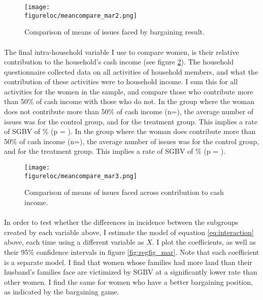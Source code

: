 \documentclass[10pt,a4paper]{scrartcl} %
\newcommand{\figureloc}{C:/Users/Koen/Dropbox/PhD/Papers/CongoGBV/Figures}
\begin{document}
\begin{figure}[H]
  \texttt{[image: \\figureloc/meancompare\_mar2.png]}
  \caption{Comparison of means of issues faced by bargaining result.}
  \label{fig:meancompare_mar2}
\end{figure}

\paragraph{}
The final intra-household variable I use to compare women, is their relative contribution to the household's cash income (see figure \ref{fig:meancompare_mar3}). The household questionnaire collected data on all activities of household members, and what the contribution of these activities were to household income. I sum this for all activities for the women in the sample, and compare those who contribute more than 50\% of cash income with those who do not. In the group where the woman does not contribute more than 50\% of cash income (n=), the average number of issues was  for the control group, and  for the treatment group. This implies a rate of SGBV of \% (p = ). In the group where the woman does contribute more than 50\% of cash income (n=), the average number of issues was  for the control group, and  for the treatment group. This implies a rate of SGBV of \% (p = ). 

\begin{figure}[H]
  \texttt{[image: \\figureloc/meancompare\_mar3.png]}
  \caption{Comparison of means of issues faced across contribution to cash income.}
  \label{fig:meancompare_mar3}
\end{figure}


\paragraph{}
In order to test whether the differences in incidence between the subgroups created by each variable above, I estimate the model of equation \ref{eq:interaction} above, each time using a different variable as $X$. I plot the coefficients, as well as their 95\% confidence intervals in figure \ref{fig:regfig_mar}. Note that each coefficient is a separate model. I find that women whose families had more land than their husband's families face are victimized by SGBV at a significantly lower rate than other women. I find the same for women who have a better bargaining position, as indicated by the bargaining game.
\end{document}
